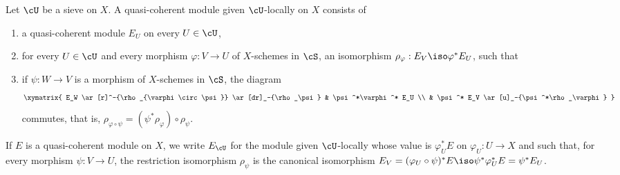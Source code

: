 \subsubsection{}\label{I:1-4-4}

Let $\cU$ be a sieve on $X$. A quasi-coherent module given
$\cU$-locally on $X$ consists of
\begin{enumerate}[\indent a)]
  \item a quasi-coherent module $E_U$ on every $U\in\cU$,
  \item for every $U\in\cU$ and every morphism $\varphi:V\to U$ of
    $X$-schemes in $\cS$, an isomorphism
    $\rho_\varphi:E_V\iso\varphi^*E_U$, such that
  \item if $\psi:W\to V$ is a morphism of $X$-schemes in $\cS$, the
    diagram
    \[\xymatrix{
      E_W \ar[r]^-{\rho_{\varphi\circ\psi}} \ar[dr]_-{\rho_\psi}
        & \psi^*\varphi^* E_U \\
      & \psi^* E_V \ar[u]_-{\psi^*\rho_\varphi}
    }\]
    commutes, that is,
    $\rho_{\varphi\circ\psi}=(\psi^*\rho_\varphi)\circ\rho_\psi$.
\end{enumerate}

If $E$ is a quasi-coherent module on $X$, we write $E_\cU$ for the
module given $\cU$-locally whose value is $\varphi_U^*E$ on $\varphi_U:U\to X$ and such that, for every morphism $\psi:V\to U$, the
restriction isomorphism $\rho_\psi$ is the canonical isomorphism
$E_V=(\varphi_U\circ\psi)^*E\iso\psi^*\varphi_U^*E=\psi^*E_U$.

